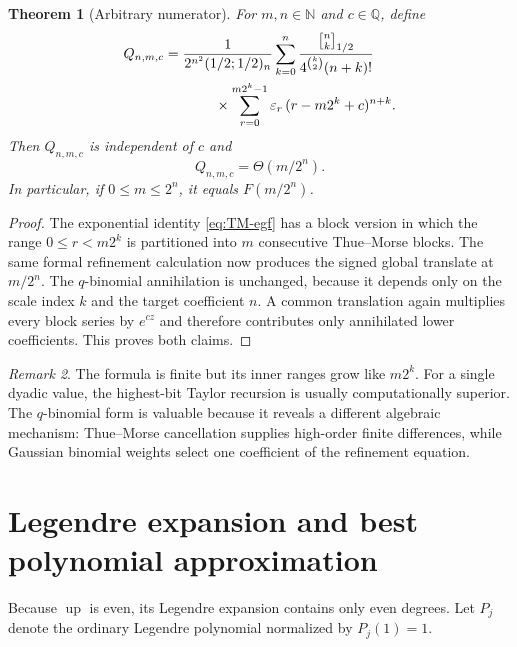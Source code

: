 \documentclass[11pt,oneside]{article}
\newtheorem{theorem}{Theorem}[section]
\theoremstyle{definition}
\theoremstyle{remark}
\newtheorem{remark}[theorem]{Remark}
\newcommand{\upf}{\operatorname{up}}
\newcommand{\epsTM}{\varepsilon}
\newcommand{\N}{\mathbb N}
\newcommand{\Q}{\mathbb Q}
\newcommand{\Thetaf}{\Theta}
\newcommand{\gaussbinom}[3]{\genfrac{[}{]}{0pt}{}{#1}{#2}_{#3}}
\begin{document}
\begin{theorem}[Arbitrary numerator]\label{thm:q-arbitrary-numerator}
For $m,n\in\N$ and $c\in\Q$, define
\begin{equation}\label{eq:q-arbitrary-expression}
\begin{split}
 Q_{n,m,c}={}&
 \frac{1}{2^{n^2}(1/2;1/2)_n}
 \sum_{k=0}^{n}
 \frac{\gaussbinom{n}{k}{1/2}}
 {4^{\binom k2}(n+k)!}\\
 &\hspace{0.8cm}\times
 \sum_{r=0}^{m2^k-1}\epsTM_r\,(r-m2^k+c)^{n+k}.
\end{split}
\end{equation}
Then $Q_{n,m,c}$ is independent of $c$ and
\begin{equation}\label{eq:q-arbitrary-value}
  Q_{n,m,c}=\Thetaf(m/2^n).
\end{equation}
In particular, if $0\le m\le2^n$, it equals $F(m/2^n)$.
\end{theorem}

\begin{proof}
The exponential identity \eqref{eq:TM-egf} has a block version in which the range
$0\le r<m2^k$ is partitioned into $m$ consecutive Thue--Morse blocks.  The same
formal refinement calculation now produces the signed global translate at
$m/2^n$.  The $q$-binomial annihilation is unchanged, because it depends only on
the scale index $k$ and the target coefficient $n$.  A common translation again
multiplies every block series by $e^{cz}$ and therefore contributes only annihilated
lower coefficients.  This proves both claims.
\end{proof}

\begin{remark}
The formula is finite but its inner ranges grow like $m2^k$.  For a single dyadic
value, the highest-bit Taylor recursion is usually computationally superior.  The
$q$-binomial form is valuable because it reveals a different algebraic mechanism:
Thue--Morse cancellation supplies high-order finite differences, while Gaussian
binomial weights select one coefficient of the refinement equation.
\end{remark}

\section{Legendre expansion and best polynomial approximation}\label{sec:legendre}

Because $\upf$ is even, its Legendre expansion contains only even degrees.  Let
$P_j$ denote the ordinary Legendre polynomial normalized by $P_j(1)=1$.
\end{document}
